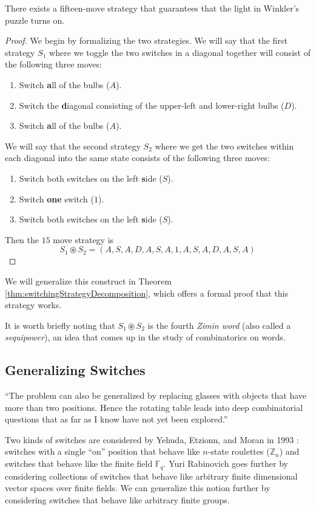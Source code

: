 \begin{proposition}
  There exists a fifteen-move strategy that guarantees that the light in
  Winkler's puzzle turns on.
\end{proposition}
\begin{proof}
  We begin by formalizing the two strategies. We will say that the first
  strategy $S_1$ where we toggle the two switches in a diagonal together
  will consist of the following three moves: \begin{enumerate}
    \item Switch \textbf{a}ll of the bulbs ($A$).
    \item Switch the \textbf{d}iagonal consisting of the upper-left and lower-right bulbs ($D$).
    \item Switch \textbf{a}ll of the bulbs ($A$).
  \end{enumerate}
  We will say that the second strategy $S_2$ where we get the two switches
  within each diagonal into the same state consists of the following three
  moves: \begin{enumerate}
    \item Switch both switches on the left \textbf{s}ide ($S$).
    \item Switch \textbf{one} switch ($1$).
    \item Switch both switches on the left \textbf{s}ide ($S$).
  \end{enumerate}
  Then the $15$ move strategy is \[
    S_1 \circledast S_2 = (A, S, A, D, A, S, A, 1, A, S, A, D, A, S, A)
  \]
\end{proof}

We will generalize this construct in
Theorem \ref{thm:switchingStrategyDecomposition},
which offers a formal proof that this strategy works.

It is worth briefly noting that $S_1 \circledast S_2$ is the fourth
\textit{Zimin word} (also called a \textit{sequipower}),
an idea that comes up in the study of combinatorics on words.

\subsection{Generalizing Switches}
``The problem can also be generalized by replacing glasses with objects that
have more than two positions. Hence the rotating table leads into deep
combinatorial questions that as far as I know have not yet been explored.''
\cite{Gardner1979Solution}

Two kinds of switches are considered by Yehuda, Etzionn, and Moran in 1993
\cite{Yehuda1993}: switches with a single ``on'' position that behave like
$n$-state roulettes ($\mathbb Z_n$) and switches that behave like
the finite field $\mathbb F_q$.
Yuri Rabinovich \cite{Rabinovich2022} goes further by considering collections
of switches that behave like arbitrary finite dimensional vector spaces over
finite fields.
We can generalize this notion further by considering
switches that behave like arbitrary finite groups.

